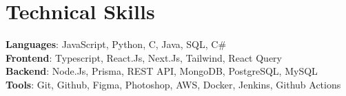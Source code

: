 \section{Technical Skills}
 \begin{itemize}[leftmargin=0.15in, label={}]
    \small{\item{
     \textbf{Languages}{: JavaScript, Python, C, Java, SQL, C\#} \\
     \textbf{Frontend}{: Typescript, React.Js, Next.Js, Tailwind, React Query} \\
     \textbf{Backend}{: Node.Js, Prisma, REST API, MongoDB, PostgreSQL, MySQL} \\
     \textbf{Tools}{: Git, Github, Figma, Photoshop, AWS, Docker, Jenkins, Github Actions} \\
    }}
 \end{itemize}
 \vspace{-14pt}
